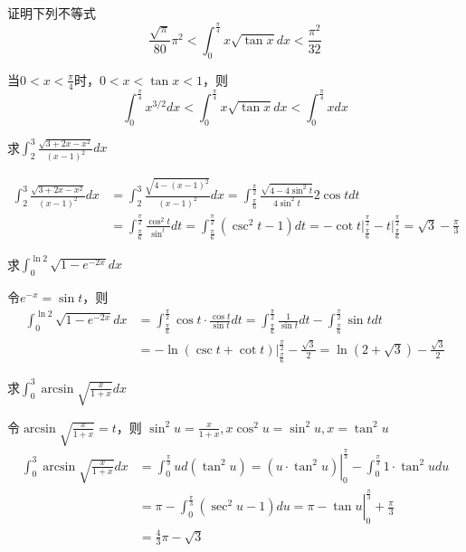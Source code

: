 \documentclass{article}
\begin{document}
\begin{examplle}[]
证明下列不等式
\begin{equation*}
\frac{\sqrt{\pi}}{80}\pi^2<\int_0^{\frac{\pi}{4}}x\sqrt{\tan x}dx<
\frac{\pi^2}{32}
\end{equation*}

当\(0<x<\frac{\pi}{4}\)时，\(0<x<\tan x<1\)，则
\begin{equation*}
\int_0^{\frac{\pi}{4}}x^{3/2}dx<\int_0^{\frac{\pi}{4}}x\sqrt{\tan x}dx
<\int^{\frac{\pi}{4}}_0xdx
\end{equation*}
\end{examplle}

\begin{examplle}[]
求\(\displaystyle\int_2^3\frac{\sqrt{3+2x-x^2}}{(x-1)^2}dx\)

\begin{align*}
\int_2^3\frac{\sqrt{3+2x-x^2}}{(x-1)^2}dx&=
\int_2^3\frac{\sqrt{4-(x-1)^2}}{(x-1)^2}dx=
\int^{\frac{\pi}{2}}_{\frac{\pi}{6}}\frac{\sqrt{4-4\sin^2t}}{4\sin^2t}2\cos tdt\\
&=\int^{\frac{\pi}{2}}_{\frac{\pi}{6}}\frac{\cos^2t}{\sin^t}dt=
\int^{\frac{\pi}{2}}_{\frac{\pi}{6}}(\csc^2t-1)dt=-\cot t\rvert^{\frac{\pi}{2}}_{\frac{\pi}{6}}
-t\rvert^{\frac{\pi}{2}}_{\frac{\pi}{6}}=\sqrt{3}-\frac{\pi}{3}
\end{align*}
\end{examplle}

\begin{examplle}[]
求\(\displaystyle\int_0^{\ln2}\sqrt{1-e^{-2x}}dx\)

令\(e^{-x}=\sin t\)，则
\begin{align*}
\int_0^{\ln2}\sqrt{1-e^{-2x}}dx&=
\int_{\frac{\pi}{6}}^{\frac{\pi}{2}}\cos t\cdot\frac{\cos t}{\sin t}dt=
\int_{\frac{\pi}{6}}^{\frac{\pi}{2}}\frac{1}{\sin t}dt-
\int_{\frac{\pi}{6}}^{\frac{\pi}{2}}\sin tdt\\
&=-\ln(\csc t+\cot t)\rvert_{\frac{\pi}{6}}^{\frac{\pi}{2}}-\frac{\sqrt{3}}{2}
=\ln(2+\sqrt{3})-\frac{\sqrt{3}}{2}
\end{align*}
\end{examplle}

\begin{examplle}[]
求\(\displaystyle\int_0^3\arcsin\sqrt{\frac{x}{1+x}}dx\)

令\(\arcsin\sqrt{\frac{x}{1+x}}=t\)，则
\(\sin^2u=\frac{x}{1+x},x\cos^2u=\sin^2u,x=\tan^2u\)
\begin{align*}
\int_0^3\arcsin\sqrt{\frac{x}{1+x}}dx&=
\left.\int_0^{\frac{\pi}{3}}ud(\tan^2u)=(u\cdot\tan^2u)\right\rvert_0^{\frac{\pi}{3}}
-\int_0^{\frac{\pi}{3}}1\cdot\tan^2udu\\
&\left.=\pi-\int_0^{\frac{\pi}{3}}(\sec^2u-1)du=\pi-\tan u\right\rvert_0^{\frac{\pi}{3}}
+\frac{\pi}{3}\\
&=\frac{4}{3}\pi-\sqrt{3}
\end{align*}
\end{examplle}
\end{document}
